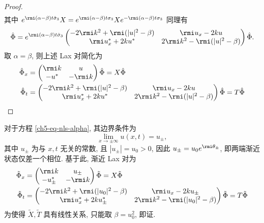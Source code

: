 \begin{proof}
\begin{equation}
\begin{aligned}
        \end{aligned}
    \end{equation}
    其中 $e^{\rmi (\alpha - \beta) t \hat{\sigma}_{3}} X = e^{\rmi (\alpha - \beta) t \sigma_{3}} X e^{-\rmi (\alpha - \beta) t \sigma_{3}}$
    同理有
    \begin{equation}
        \hat{\Phi} = e^{\rmi (\alpha - \beta) t \hat{\sigma}_{3}} \begin{pmatrix}
            -2 \rmi k^{2} + \rmi(|u|^{2} - \beta) & \rmi u_{x} - 2 k u                   \\
            \rmi u_{x}^{*} + 2 k u^{*}            & 2 \rmi k^{2} - \rmi(|u|^{2} - \beta)
        \end{pmatrix} \hat{\Phi}.
    \end{equation}
    取 $\alpha = \beta$, 则上述 Lax 对简化为
    \begin{align}
        \hat{\Phi}_{x} & = \begin{pmatrix}
                               \rmi k & u \\ -u^{*} & -\rmi k
                           \end{pmatrix} \hat{\Phi}= X \hat{\Phi}                                       \\
        \hat{\Phi}_{t} & = \begin{pmatrix}
                               -2 \rmi k^{2} + \rmi(|u|^{2} - \beta) & \rmi u_{x} - 2 k u                   \\
                               \rmi u_{x}^{*} + 2 k u^{*}            & 2 \rmi k^{2} - \rmi(|u|^{2} - \beta)
                           \end{pmatrix} \hat{\Phi} = T \hat{\Phi}
    \end{align} \label{ch5-eq-lax-alpha}
\end{proof}
对于方程 \eqref{ch5-eq-nls-alpha}, 其边界条件为
\begin{equation}
    \lim_{x \to \pm \infty} u(x,t) = u_{\pm}, \label{ch5-eq-bc-alpha}
\end{equation}
其中 $u_{\pm}$ 为与 $x,t$ 无关的常数, 且 $ |u_{\pm}| = u_{0} > 0$, 因此 $u_{\pm} = u_{0} e^{\rmi \theta_{\pm}}$, 即两端渐近状态仅差一个相位. 基于此, 渐近 Lax 对为
\begin{align}
    \tilde{\Phi}_{x} & = \begin{pmatrix}
                             \rmi k & u_{\pm} \\ -u_{\pm}^{*} & -\rmi k
                         \end{pmatrix} \tilde{\Phi}= X \tilde{\Phi}                                           \\
    \tilde{\Phi}_{t} & = \begin{pmatrix}
                             -2 \rmi k^{2} + \rmi(|u_{0}|^{2} - \beta) & \rmi u_{x} - 2 k u_{\pm}                 \\
                             \rmi u_{x}^{*} + 2 k u_{\pm}^{*}          & 2 \rmi k^{2} - \rmi(|u_{0}|^{2} - \beta)
                         \end{pmatrix} \tilde{\Phi} = T \tilde{\Phi}
\end{align}
为使得 $\tilde{X}, \tilde{T}$ 具有线性关系, 只能取 $\beta = u_{0}^{2}$, 即证.
